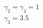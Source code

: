 \documentclass[preview]{standalone}
\begin{document}
\begin{center}
$\gamma_2 = \gamma_4 = 1$\\$\gamma_3 = 3.5$
\end{center}
\end{document}

